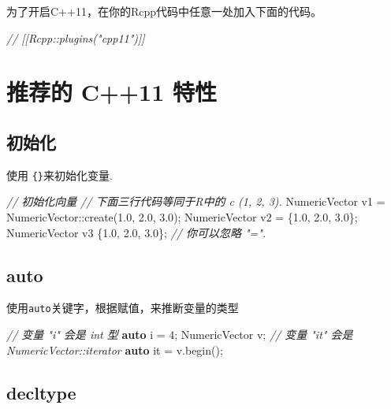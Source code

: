 \documentclass[]{ctexbook}
\newenvironment{Shaded}{\begin{snugshade}}{\end{snugshade}}
\newcommand{\KeywordTok}[1]{\textcolor[rgb]{0.13,0.29,0.53}{\textbf{#1}}}
\newcommand{\DecValTok}[1]{\textcolor[rgb]{0.00,0.00,0.81}{#1}}
\newcommand{\FloatTok}[1]{\textcolor[rgb]{0.00,0.00,0.81}{#1}}
\newcommand{\CommentTok}[1]{\textcolor[rgb]{0.56,0.35,0.01}{\textit{#1}}}
\newcommand{\NormalTok}[1]{#1}
\begin{document}
为了开启C++11，在你的Rcpp代码中任意一处加入下面的代码。

\begin{Shaded}
\begin{Highlighting}[]
\CommentTok{// [[Rcpp::plugins("cpp11")]]}
\end{Highlighting}
\end{Shaded}

\section{推荐的 C++11 特性}\label{recommend}

\subsection{初始化}\label{initializer}

使用 \texttt{\{\}}来初始化变量.

\begin{Shaded}
\begin{Highlighting}[]
\CommentTok{// 初始化向量}
\CommentTok{// 下面三行代码等同于R中的 c (1, 2, 3).}
\NormalTok{NumericVector v1 = NumericVector::create(}\FloatTok{1.0}\NormalTok{, }\FloatTok{2.0}\NormalTok{, }\FloatTok{3.0}\NormalTok{);}
\NormalTok{NumericVector v2 = \{}\FloatTok{1.0}\NormalTok{, }\FloatTok{2.0}\NormalTok{, }\FloatTok{3.0}\NormalTok{\};}
\NormalTok{NumericVector v3   \{}\FloatTok{1.0}\NormalTok{, }\FloatTok{2.0}\NormalTok{, }\FloatTok{3.0}\NormalTok{\}; }\CommentTok{// 你可以忽略 "=".}
\end{Highlighting}
\end{Shaded}

\subsection{auto}\label{auto}

使用\texttt{auto}关键字，根据赋值，来推断变量的类型

\begin{Shaded}
\begin{Highlighting}[]
\CommentTok{// 变量 "i" 会是 int 型}
\KeywordTok{auto}\NormalTok{  i  = }\DecValTok{4}\NormalTok{;}
\NormalTok{NumericVector v;}
\CommentTok{// 变量 "it" 会是 NumericVector::iterator }
\KeywordTok{auto}\NormalTok{ it = v.begin();}
\end{Highlighting}
\end{Shaded}

\subsection{decltype}\label{decltype}
\end{document}
